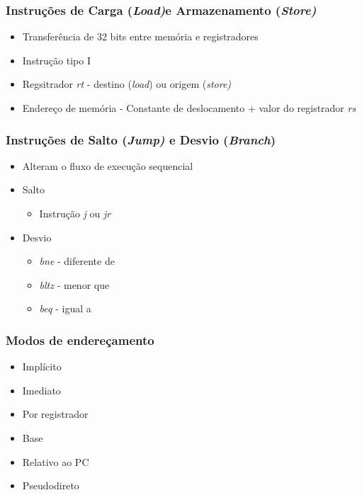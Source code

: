 \documentclass[aspectratio=169,
				xcolor=table]{beamer}
\begin{document}
	\begin{frame}
		\frametitle{Instruções de Carga (\textit{Load)}e Armazenamento (\textit{Store)}}
		\begin{itemize}
			\item Transferência de 32 bits entre memória e registradores
			\vspace{1em}
			\item Instrução tipo I
			\vspace{1em}
			\item Regsitrador \textit{rt} - destino (\textit{load}) ou origem (\textit{store)}
			\vspace{1em}
			\item Endereço de memória - Constante de deslocamento + valor do registrador \textit{rs}
		\end{itemize}
	\end{frame}
	
	\begin{frame}
		\frametitle{Instruções de Salto (\textit{Jump)} e Desvio (\textit{Branch})}
		\begin{itemize}
			\item Alteram o fluxo de execução sequencial
			\vspace{1em}
			\item Salto
			\begin{itemize}
				\item Instrução \textit{j} ou \textit{jr}
			\end{itemize}
			\vspace{1em}
			\item Desvio
			\begin{itemize}
				\item \textit{bne} - diferente de
				\item \textit{bltz} - menor que
				\item \textit{beq} - igual a
			\end{itemize}
		\end{itemize}
	\end{frame}
	
	\begin{frame}
		\frametitle{Modos de endereçamento}
		\begin{itemize}
			\item Implícito
			\item Imediato
			\item Por registrador
			\item Base
			\item Relativo ao PC
			\item Pseudodireto
		\end{itemize}
	\end{frame}
	
\end{document}
